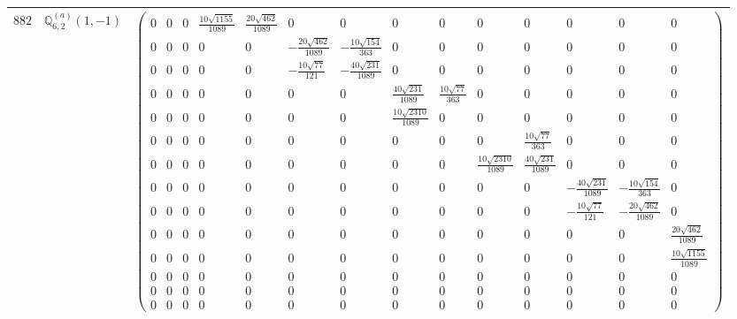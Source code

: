 \documentclass[fleqn,8pt,landscape]{jsarticle}
\begin{document}
\begin{center}
\begin{longtable}{ccc}
$ 882 $ & $ \mathbb{Q}_{6,2}^{(a)}(1,-1) $ & $ \begin{pmatrix} 0 & 0 & 0 & \frac{10 \sqrt{1155}}{1089} & \frac{20 \sqrt{462}}{1089} & 0 & 0 & 0 & 0 & 0 & 0 & 0 & 0 & 0 \\ 0 & 0 & 0 & 0 & 0 & - \frac{20 \sqrt{462}}{1089} & - \frac{10 \sqrt{154}}{363} & 0 & 0 & 0 & 0 & 0 & 0 & 0 \\ 0 & 0 & 0 & 0 & 0 & - \frac{10 \sqrt{77}}{121} & - \frac{40 \sqrt{231}}{1089} & 0 & 0 & 0 & 0 & 0 & 0 & 0 \\ 0 & 0 & 0 & 0 & 0 & 0 & 0 & \frac{40 \sqrt{231}}{1089} & \frac{10 \sqrt{77}}{363} & 0 & 0 & 0 & 0 & 0 \\ 0 & 0 & 0 & 0 & 0 & 0 & 0 & \frac{10 \sqrt{2310}}{1089} & 0 & 0 & 0 & 0 & 0 & 0 \\ 0 & 0 & 0 & 0 & 0 & 0 & 0 & 0 & 0 & 0 & \frac{10 \sqrt{77}}{363} & 0 & 0 & 0 \\ 0 & 0 & 0 & 0 & 0 & 0 & 0 & 0 & 0 & \frac{10 \sqrt{2310}}{1089} & \frac{40 \sqrt{231}}{1089} & 0 & 0 & 0 \\ 0 & 0 & 0 & 0 & 0 & 0 & 0 & 0 & 0 & 0 & 0 & - \frac{40 \sqrt{231}}{1089} & - \frac{10 \sqrt{154}}{363} & 0 \\ 0 & 0 & 0 & 0 & 0 & 0 & 0 & 0 & 0 & 0 & 0 & - \frac{10 \sqrt{77}}{121} & - \frac{20 \sqrt{462}}{1089} & 0 \\ 0 & 0 & 0 & 0 & 0 & 0 & 0 & 0 & 0 & 0 & 0 & 0 & 0 & \frac{20 \sqrt{462}}{1089} \\ 0 & 0 & 0 & 0 & 0 & 0 & 0 & 0 & 0 & 0 & 0 & 0 & 0 & \frac{10 \sqrt{1155}}{1089} \\ 0 & 0 & 0 & 0 & 0 & 0 & 0 & 0 & 0 & 0 & 0 & 0 & 0 & 0 \\ 0 & 0 & 0 & 0 & 0 & 0 & 0 & 0 & 0 & 0 & 0 & 0 & 0 & 0 \\ 0 & 0 & 0 & 0 & 0 & 0 & 0 & 0 & 0 & 0 & 0 & 0 & 0 & 0 \end{pmatrix} $ \\ \hline

\end{longtable}
\end{center}
\end{document}
